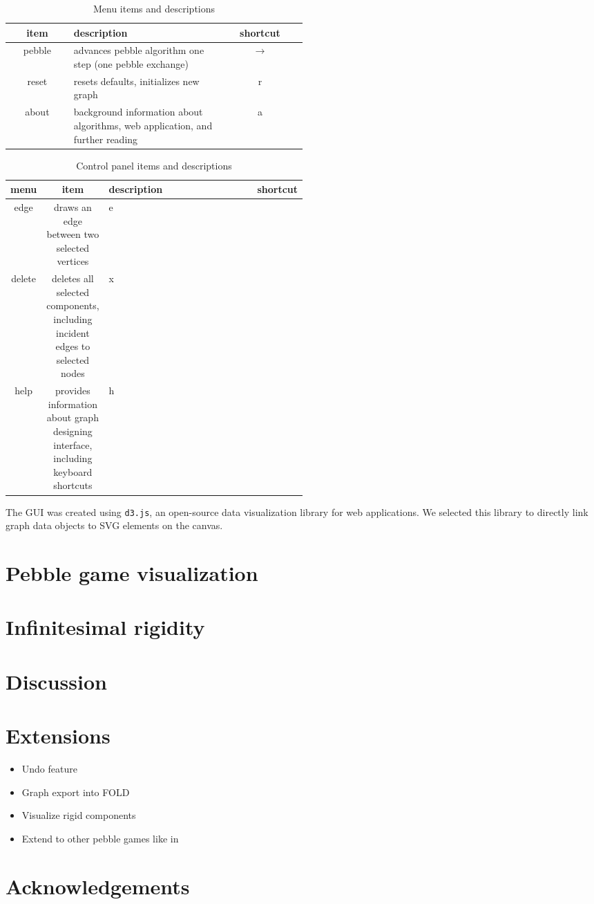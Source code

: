 \documentclass[aps,final,twocolumn,letterpaper,nofootinbib]{revtex4-1}
\begin{document}
\begin{table}[ht]
\caption{Menu items and descriptions}
\begin{tabular}{c | p{0.5\linewidth} | c}
item & description & shortcut \\ \hline
pebble & advances pebble algorithm one step
(one pebble exchange) & $\to$\\
reset & resets defaults, initializes new graph & r \\
about & background information about algorithms,
web application, and further reading & a \\
\end{tabular}
\label{tab:menu}
\end{table}

\begin{table}[ht]
\caption{Control panel items and descriptions}
\begin{tabular}{c c | p{0.5\linewidth} | c}
\multirow{3}{*}{menu} &
item & description & shortcut \\ \hline
edge & draws an edge between two selected vertices & e\\
delete & deletes all selected components, including incident edges
to selected nodes & x \\
help & provides information about graph designing interface,
including keyboard shortcuts & h \\
\end{tabular}
\label{tab:ctrl}
\end{table}

The GUI was created using \texttt{d3.js},
an open-source data visualization library for web applications.
We selected this library
to directly link graph data objects to SVG elements on the canvas.

\section{Pebble game visualization}

\section{Infinitesimal rigidity}

\section{Discussion}

\section{Extensions}

\begin{itemize}
    \item
    Undo feature
    \item
    Graph export into FOLD
    \item
    Visualize rigid components
    \item
    Extend to other pebble games like in \cite{lee08}
\end{itemize}


\section*{Acknowledgements}


{}

\end{document}
